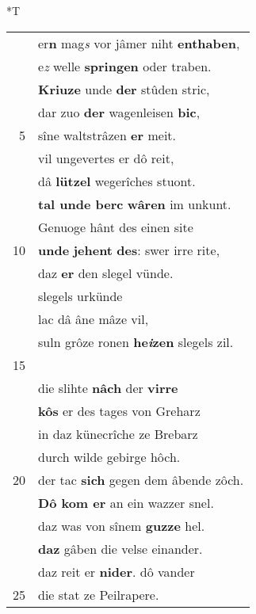 \documentclass[8pt,a4paper,notitlepage]{article}
\begin{document}
\begin{table}[ht]
\begin{minipage}[t]{0.5\linewidth}
\end{minipage}
\hspace{0.5cm}
\begin{minipage}[t]{0.5\linewidth}
\small
\begin{center}*T
\end{center}
\begin{tabular}{rl}
 & er\textbf{n} mag\textit{s} vor jâmer niht \textbf{enthaben},\\ 
 & e\textit{z} welle \textbf{springen} oder traben.\\ 
 & \textbf{Kriuze} unde \textbf{der} stûden stric,\\ 
 & dar zuo \textbf{der} wagenleisen \textbf{bic},\\ 
5 & sîne waltstrâzen \textbf{er} meit.\\ 
 & vil ungevertes er dô reit,\\ 
 & dâ \textbf{lützel} wegerîches stuont.\\ 
 & \textbf{tal unde berc} \textbf{wâren} im unkunt.\\ 
 & Genuoge hânt des einen site\\ 
10 & \textbf{unde} \textbf{jehent} \textbf{des}: swer irre rite,\\ 
 & daz \textbf{er} den slegel vünde.\\ 
 & slegels urkünde\\ 
 & lac dâ âne mâze vil,\\ 
 & suln grôze ronen \textbf{he\textit{i}zen} slegels zil.\\ 
15 & \textbf{\begin{large}D\end{large}ô} reit er \textbf{wênic} \textbf{irre}.\\ 
 & die slihte \textbf{nâch} der \textbf{virre}\\ 
 & \textbf{kôs} er des tages von Greharz\\ 
 & in daz künecrîche ze Brebarz\\ 
 & durch wilde gebirge hôch.\\ 
20 & der tac \textbf{sich} gegen dem âbende zôch.\\ 
 & \textbf{Dô kom er} an ein wazzer snel.\\ 
 & daz was von sînem \textbf{guzze} hel.\\ 
 & \textbf{daz} gâben die velse einander.\\ 
 & daz reit er \textbf{nider}. dô vander\\ 
25 & die stat ze Peilrapere.\\ 

\end{tabular}
\end{minipage}
\end{table}
\end{document}
